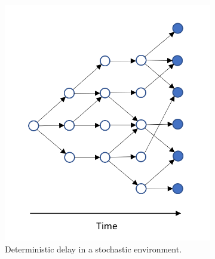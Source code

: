 \begin{figure}[t]
                    \begin{subfigure}[b]{.45\textwidth}
                        \centering
                        \includegraphics[width=\textwidth]{images/dmdp/modelbased_stochastic_3.png}
                        \caption{Deterministic delay in a stochastic environment.}
                        \label{fig:modelbased_stochastic_3}
                    \end{subfigure}
                    \hfill
                    \begin{subfigure}[b]{.45\textwidth}
                        \centering

\end{subfigure}
\end{figure}
